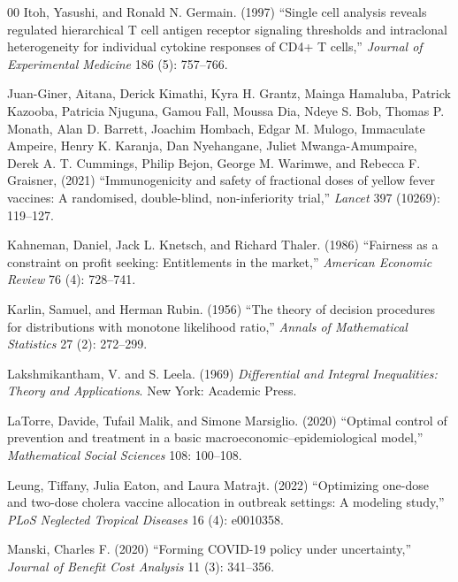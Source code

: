 \documentclass[12pt]{article}
\begin{document}
\begin{thebibliography}{00}
Itoh, Yasushi, and Ronald N. Germain. (1997) ``Single cell analysis
reveals regulated hierarchical T cell antigen receptor signaling
thresholds and intraclonal heterogeneity for individual cytokine
responses of CD4+ T cells,'' {\em Journal of Experimental Medicine}
186 (5): 757--766.

Juan-Giner, Aitana, Derick Kimathi, Kyra H. Grantz, Mainga Hamaluba,
Patrick Kazooba, Patricia Njuguna, Gamou Fall, Moussa Dia, Ndeye
S. Bob, Thomas P. Monath, Alan D. Barrett, Joachim Hombach, Edgar
M. Mulogo, Immaculate Ampeire, Henry K. Karanja, Dan Nyehangane,
Juliet Mwanga-Amumpaire, Derek A. T. Cummings, Philip Bejon, George
M. Warimwe, and Rebecca F. Graisner, (2021) ``Immunogenicity and
safety of fractional doses of yellow fever vaccines: A randomised,
double-blind, non-inferiority trial,'' {\em Lancet} 397 (10269):
119--127.

Kahneman, Daniel, Jack L. Knetsch, and Richard Thaler. (1986)
``Fairness as a constraint on profit seeking: Entitlements in the
market,'' {\em American Economic Review} 76 (4): 728--741.

Karlin, Samuel, and Herman Rubin. (1956) ``The theory of decision
procedures for distributions with monotone likelihood ratio,'' {\em
  Annals of Mathematical Statistics} 27 (2): 272--299.

Lakshmikantham, V. and S. Leela. (1969) {\em Differential and Integral
  Inequalities: Theory and Applications}. New York: Academic Press.

LaTorre, Davide, Tufail Malik, and Simone Marsiglio. (2020) ``Optimal
control of prevention and treatment in a basic
macroeconomic–epidemiological model,'' {\em Mathematical Social
  Sciences} 108: 100--108.

Leung, Tiffany, Julia Eaton, and Laura Matrajt. (2022) ``Optimizing
one-dose and two-dose cholera vaccine allocation in outbreak settings:
A modeling study,'' {\em PLoS Neglected Tropical Diseases} 16 (4):
e0010358.

Manski, Charles F. (2020) ``Forming COVID-19 policy under
uncertainty,'' {\em Journal of Benefit Cost Analysis} 11 (3):
341--356.


\end{thebibliography}
\end{document}
